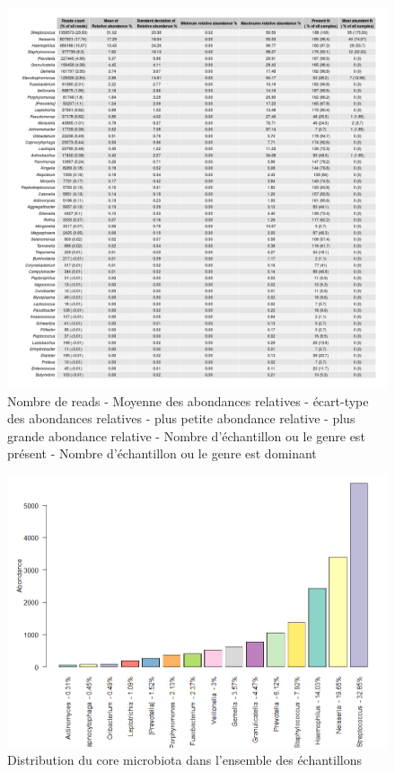 \documentclass[12pt,a4paper]{article}
\begin{document}
\begin{figure}
\begin{center}
\includegraphics[scale=0.4]{img/alld.png}\hfill
\end{center}
\caption{Nombre de reads - Moyenne des abondances relatives - écart-type des abondances relatives - plus petite abondance relative - plus grande abondance relative - Nombre d'échantillon ou le genre est présent - Nombre d'échantillon ou le genre est dominant}
\label{alltable}
\end{figure}


\begin{figure}[t]
\begin{center}
\includegraphics[scale=0.5]{img/core.png}\hfill
\end{center}
\caption{Distribution du core microbiota dans l'ensemble des échantillons}
\label{core}
\end{figure}
\end{document}
